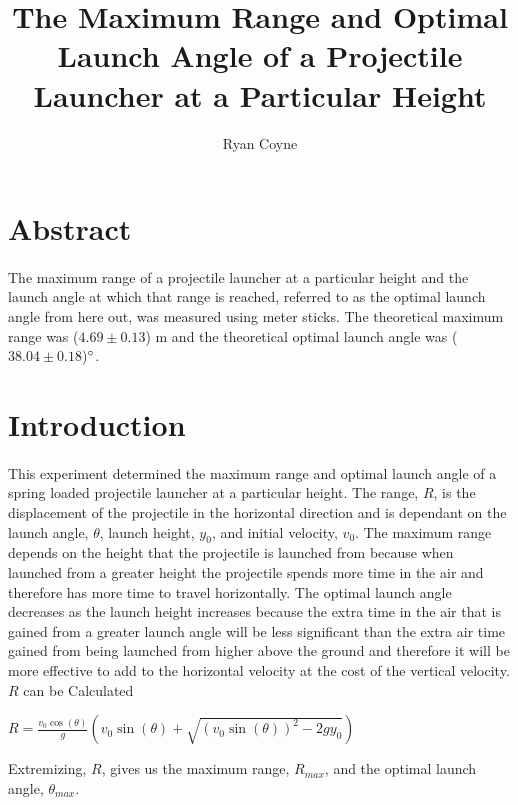 \documentclass[12pt]{article}
\begin{document}
    \title{The Maximum Range and Optimal Launch Angle of a Projectile Launcher at a Particular Height}
    \author{Ryan Coyne}
    \maketitle
    \section{Abstract}
        \paragraph{}The maximum range of a projectile launcher at a particular height and the launch angle 
        at which that range is reached, referred to as the optimal launch angle from here out, was measured using meter 
        sticks. The theoretical maximum range was (\(4.69 \pm 0.13\)) m and the theoretical optimal launch angle was 
        (\(38.04 \pm 0.18\))\(\degree\).
    \section{Introduction}
         \paragraph{}This experiment determined the maximum range and optimal launch angle of a spring loaded projectile launcher at a 
         particular height. The range, $R$, is the displacement of the projectile in the horizontal direction and is dependant 
         on the launch angle, $\theta$, launch height, $y_0$, and initial velocity, $v_0$.  The maximum range depends on the height that the projectile is 
         launched from because when launched from 
         a greater height the projectile spends more time in the air and therefore has more time to travel horizontally. The 
         optimal launch angle decreases as the launch height increases because the extra time in the air that is gained from a 
         greater launch angle will be less significant than the extra air time gained from being launched from higher above the ground 
         and therefore it will be more effective to add to the horizontal velocity at the cost of the vertical velocity. $R$ can be 
         Calculated
         \begin{center}
             \(R = \frac{v_0 \cos(\theta)}{g}\left(v_0 \sin(\theta) +\sqrt{(v_0 \sin(\theta))^2-2gy_{0}}\right)\)
         \end{center}
         Extremizing, $R$, gives us the maximum range, $R_{max}$, and the optimal launch angle, $\theta_{max}$. 
\end{document}
